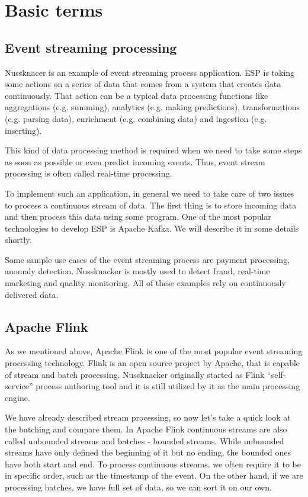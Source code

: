 \chapter{Basic terms}
\label{chap:basic}

\section{Event streaming processing}

Nussknacer is an example of event streaming process application.
ESP is taking some actions on a series of data that comes from a system that creates data continuously.
That action can be a typical data processing functions like aggregations (e.g. summing),
analytics (e.g. making predictions), transformations (e.g. parsing data), enrichment (e.g. combining data)
and ingestion (e.g. inserting).

This kind of data processing method is required when we need to take some steps as soon as possible or even predict incoming events.
Thus, event stream processing is often called real-time processing.

To implement such an application, in general we need to take care of two issues to process a continuous stream of data.
The first thing is to store incoming data and then process this data using some program.
One of the most popular technologies to develop ESP is Apache Kafka. We will describe it in some details shortly.

Some sample use cases of the event streaming process are payment processing, anomaly detection.
Nussknacker is mostly used to detect fraud, real-time marketing and quality monitoring.
All of these examples rely on continuously delivered data.\cite{esp}

\section{Apache Flink}

As we mentioned above, Apache Flink is one of the most popular event streaming processing technology.
Flink is an open source project by Apache, that is capable of stream and batch processing. Nussknacker originally started
as Flink “self-service” process authoring tool and it is still utilized by it as the main processing engine.

We have already described stream processing, so now let’s take a quick look at the batching and compare them.
In Apache Flink continuous streams are also called unbounded streams and batches -  bounded streams.
While unbounded streams have only defined the beginning of it but no ending, the bounded ones have both start and end.
To process continuous streams, we often require it to be in specific order, such as the timestamp of the event.
On the other hand, if we are processing batches, we have full set of data, so we can sort it on our own.


